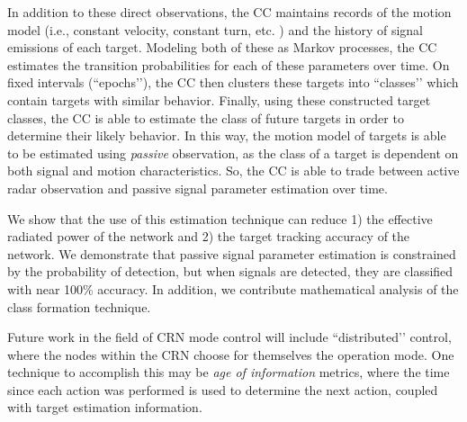 \documentclass[journal,12pt,onecolumn,draftclsnofoot,]{IEEEtran}
\theoremstyle{definition}
\begin{document}
In addition to these direct observations, the CC maintains records of the motion model (i.e., constant velocity, constant turn, etc. ) and the history of signal emissions of each target. 
Modeling both of these as Markov processes, the CC estimates the transition probabilities for each of these parameters over time. 
On fixed intervals (``epochs’’), the CC then clusters these targets into ``classes’’ which contain targets with similar behavior. 
Finally, using these constructed target classes, the CC is able to estimate the class of future targets in order to determine their likely behavior. 
In this way, the motion model of targets is able to be estimated using \emph{passive} observation, as the class of a target is dependent on both signal and motion characteristics. 
So, the CC is able to trade between active radar observation and passive signal parameter estimation over time. 

We show that the use of this estimation technique can reduce 1) the effective radiated power of the network and 2) the target tracking accuracy of the network. 
We demonstrate that passive signal parameter estimation is constrained by the probability of detection, but when signals are detected, they are classified with near 100\% accuracy. 
In addition, we contribute mathematical analysis of the class formation technique. 

Future work in the field of CRN mode control will include ``distributed’’ control, where the nodes within the CRN choose for themselves the operation mode. 
One technique to accomplish this may be \emph{age of information} metrics, where the time since each action was performed is used to determine the next action, coupled with target estimation information. 










\end{document}
